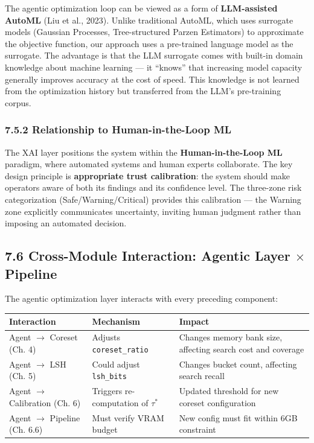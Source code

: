 \documentclass[12pt, a4paper, oneside]{report}
\begin{document}
The agentic optimization loop can be viewed as a form of \textbf{LLM-assisted AutoML} (Liu et al., 2023). Unlike traditional AutoML, which uses surrogate models (Gaussian Processes, Tree-structured Parzen Estimators) to approximate the objective function, our approach uses a pre-trained language model as the surrogate. The advantage is that the LLM surrogate comes with built-in domain knowledge about machine learning --- it ``knows'' that increasing model capacity generally improves accuracy at the cost of speed. This knowledge is not learned from the optimization history but transferred from the LLM's pre-training corpus.

\subsubsection{7.5.2 Relationship to Human-in-the-Loop ML}\label{relationship-to-human-in-the-loop-ml}

The XAI layer positions the system within the \textbf{Human-in-the-Loop ML} paradigm, where automated systems and human experts collaborate. The key design principle is \textbf{appropriate trust calibration}: the system should make operators aware of both its findings and its confidence level. The three-zone risk categorization (Safe/Warning/Critical) provides this calibration --- the Warning zone explicitly communicates uncertainty, inviting human judgment rather than imposing an automated decision.

\bigskip\noindent\hrulefill\bigskip

\subsection{7.6 Cross-Module Interaction: Agentic Layer $\times$ Pipeline}\label{cross-module-interaction-agentic-layer-pipeline}

The agentic optimization layer interacts with every preceding component:

{\def\LTcaptype{none} %
\begin{longtable}[]{@{}lll@{}}
\toprule\noalign{}
Interaction & Mechanism & Impact \\
\midrule\noalign{}
\endhead
\bottomrule\noalign{}
\endlastfoot
Agent $\rightarrow$ Coreset (Ch. 4) & Adjusts \texttt{coreset\_ratio} & Changes memory bank size, affecting search cost and coverage \\
Agent $\rightarrow$ LSH (Ch. 5) & Could adjust \texttt{lsh\_bits} & Changes bucket count, affecting search recall \\
Agent $\rightarrow$ Calibration (Ch. 6) & Triggers re-computation of \(\tau^*\) & Updated threshold for new coreset configuration \\
Agent $\rightarrow$ Pipeline (Ch. 6.6) & Must verify VRAM budget & New config must fit within 6GB constraint \\
\end{longtable}
}
\end{document}
